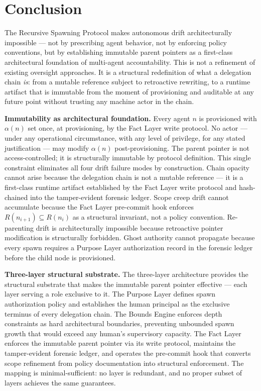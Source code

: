 \section{Conclusion}
\label{sec:rs-conclusion}

The Recursive Spawning Protocol makes autonomous drift architecturally impossible — not by prescribing agent behavior, not by enforcing policy conventions, but by establishing immutable parent pointers as a first-class architectural foundation of multi-agent accountability. This is not a refinement of existing oversight approaches. It is a structural redefinition of what a delegation chain \emph{is}: from a mutable reference subject to retroactive rewriting, to a runtime artifact that is immutable from the moment of provisioning and auditable at any future point without trusting any machine actor in the chain.

\medskip
\noindent\textbf{Immutability as architectural foundation.} Every agent $n$ is provisioned with $\alpha(n)$ set once, at provisioning, by the Fact Layer write protocol. No actor — under any operational circumstance, with any level of privilege, for any stated justification — may modify $\alpha(n)$ post-provisioning. The parent pointer is not access-controlled; it is structurally immutable by protocol definition. This single constraint eliminates all four drift failure modes by construction. Chain opacity cannot arise because the delegation chain is not a mutable reference — it is a first-class runtime artifact established by the Fact Layer write protocol and hash-chained into the tamper-evident forensic ledger. Scope creep drift cannot accumulate because the Fact Layer pre-commit hook enforces $R(n_{i+1}) \subseteq R(n_i)$ as a structural invariant, not a policy convention. Re-parenting drift is architecturally impossible because retroactive pointer modification is structurally forbidden. Ghost authority cannot propagate because every spawn requires a Purpose Layer authorization record in the forensic ledger before the child node is provisioned.

\medskip
\noindent\textbf{Three-layer structural substrate.} The \bxthree three-layer architecture provides the structural substrate that makes the immutable parent pointer effective — each layer serving a role exclusive to it. The Purpose Layer defines spawn authorization policy and establishes the human principal as the exclusive terminus of every delegation chain. The Bounds Engine enforces depth constraints as hard architectural boundaries, preventing unbounded spawn growth that would exceed any human's supervisory capacity. The Fact Layer enforces the immutable parent pointer via its write protocol, maintains the tamper-evident forensic ledger, and operates the pre-commit hook that converts scope refinement from policy documentation into structural enforcement. The mapping is minimal-sufficient: no layer is redundant, and no proper subset of layers achieves the same guarantees.

